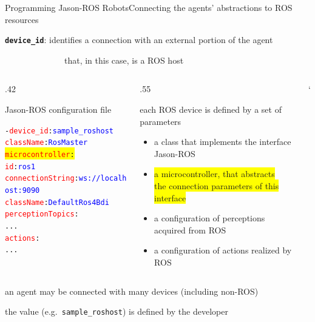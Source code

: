 \documentclass[compress]{beamer}
\newcommand{\yamlkey}[1]{\textcolor{red}{\texttt{#1}}}
\newcommand{\yamlvalue}[1]{\textcolor{blue}{\texttt{#1}}}
\begin{document}
\begin{frame}[fragile]{Programming Jason-ROS Robots}{Connecting the agents' abstractions to ROS resources}

    \footnotesize
    \texttt{{\bf device\_id}}: identifies a connection with an external portion of the agent\\ 
    
    \vspace{-.5cm}
    
    \ \ \ \ \ \ \ \ \ \ \ \ \ \ {\tiny that, in this case, is a ROS host}

    
    \begin{columns}
       \begin{column}{.42\textwidth}      
            \begin{block}{{\scriptsize Jason-ROS configuration file}}
                \scriptsize
                \begin{alltt} \tiny
- \yamlkey{device\_id}: \yamlvalue{sample\_roshost}
  \yamlkey{className}: \yamlvalue{RosMaster}
  \colorbox{yellow}{\yamlkey{microcontroller}:} 
    \yamlkey{id}: \yamlvalue{ros1} 
    \yamlkey{connectionString}: \yamlvalue{ws://localhost:9090} 
    \yamlkey{className}: \yamlvalue{DefaultRos4Bdi}
  \yamlkey{perceptionTopics}:         
    ...
  \yamlkey{actions}:       
    ...
                \end{alltt}

            \end{block}    
        \end{column}
        
        \hspace{-25pt} %
  
        \begin{column}{.55\textwidth} \scriptsize
  
            each ROS device is defined by a set of parameters
            \begin{itemize}\tiny
                \item a class that implements the interface Jason-ROS
                \item\colorbox{yellow}{ a microcontroller, that abstracts} \\ \colorbox{yellow}{the connection parameters of this interface}
                \item a configuration of perceptions acquired from ROS
                \item a configuration of actions realized by ROS
            \end{itemize}
        \end{column}`      
    \end{columns}
  
  
    \vspace{.3cm}
  
    an agent may be connected with many devices {\tiny (including non-ROS)}\\ \vspace{-.2cm}
  
    the value (e.g.~\texttt{sample\_roshost}) is defined by the developer
    
\end{frame}
\end{document}
